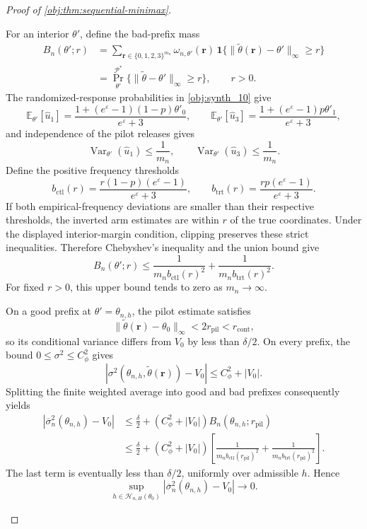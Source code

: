\begin{proof}[Proof of \cref{obj:thm:sequential-minimax}]
\begin{enumerate}
For an interior \(\theta'\), define the bad-prefix mass
\[
\begin{aligned}
B_n(\theta';r)
&=
\sum_{\mathbf r\in\{0,1,2,3\}^{m_n}}
\omega_{n,\theta'}(\mathbf r)\,
\mathbf1\{
\|\widetilde\theta(\mathbf r)-\theta'\|_\infty\ge r
\}\\
&=
\Pr_{\theta'}^{\mathcal P^*}
\{\|\widetilde\theta-\theta'\|_\infty\ge r\},
\qquad r>0.
\end{aligned}
\]
The randomized-response probabilities in \cref{obj:synth_10} give
\[
\mathbb E_{\theta'}[\widehat u_1]
=
\frac{1+(e^\varepsilon-1)(1-p)\theta'_0}
{e^\varepsilon+3},
\qquad
\mathbb E_{\theta'}[\widehat u_3]
=
\frac{1+(e^\varepsilon-1)p\theta'_1}
{e^\varepsilon+3},
\]
and independence of the pilot releases gives
\[
\operatorname{Var}_{\theta'}(\widehat u_1)\le\frac1{m_n},
\qquad
\operatorname{Var}_{\theta'}(\widehat u_3)\le\frac1{m_n}.
\]
Define the positive frequency thresholds
\[
b_{\mathrm{ctl}}(r)
=
\frac{r(1-p)(e^\varepsilon-1)}{e^\varepsilon+3},
\qquad
b_{\mathrm{trt}}(r)
=
\frac{rp(e^\varepsilon-1)}{e^\varepsilon+3}.
\]
If both empirical-frequency deviations are smaller than their respective thresholds, the inverted arm estimates are within \(r\) of the true coordinates. Under the displayed interior-margin condition, clipping preserves these strict inequalities. Therefore Chebyshev's inequality and the union bound give
\[
B_n(\theta';r)
\le
\frac1{m_n b_{\mathrm{ctl}}(r)^2}
+
\frac1{m_n b_{\mathrm{trt}}(r)^2}.
\]
For fixed \(r>0\), this upper bound tends to zero as \(m_n\to\infty\).

On a good prefix at \(\theta'=\theta_{n,h}\), the pilot estimate satisfies
\[
\|\widetilde\theta(\mathbf r)-\theta_0\|_\infty
<
2r_{\mathrm{pil}}<r_{\mathrm{cont}},
\]
so its conditional variance differs from \(V_0\) by less than \(\delta/2\). On every prefix, the bound \(0\le\sigma^2\le C_\phi^2\) gives
\[
|\sigma^2(\theta_{n,h},\widetilde\theta(\mathbf r))-V_0|
\le C_\phi^2+|V_0|.
\]
Splitting the finite weighted average into good and bad prefixes consequently yields
\[
\begin{aligned}
|\overline\sigma_n^2(\theta_{n,h})-V_0|
&\le
\frac{\delta}{2}
+
(C_\phi^2+|V_0|)B_n(\theta_{n,h};r_{\mathrm{pil}})\\
&\le
\frac{\delta}{2}
+
(C_\phi^2+|V_0|)
\left[
\frac1{m_n b_{\mathrm{ctl}}(r_{\mathrm{pil}})^2}
+
\frac1{m_n b_{\mathrm{trt}}(r_{\mathrm{pil}})^2}
\right].
\end{aligned}
\]
The last term is eventually less than \(\delta/2\), uniformly over admissible \(h\). Hence
\[
\sup_{h\in\mathcal H_{n,H}(\theta_0)}
|\overline\sigma_n^2(\theta_{n,h})-V_0|
\longrightarrow0.
\]


\end{enumerate}
\end{proof}
